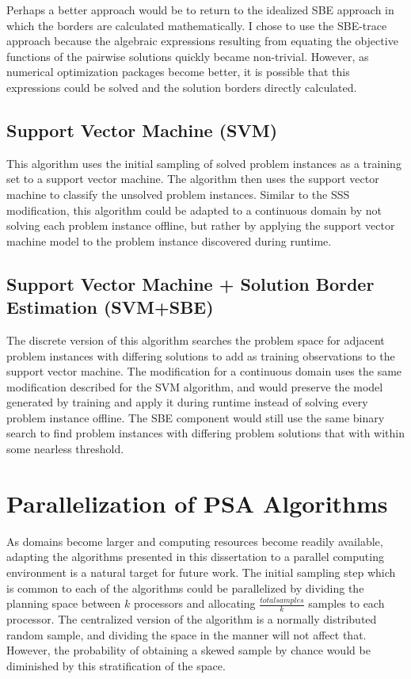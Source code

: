 Perhaps a better approach would be to return to the idealized SBE approach in which the borders are calculated mathematically. I chose to use the SBE-trace approach because the algebraic expressions resulting from equating the objective functions of the pairwise solutions quickly became non-trivial. However, as numerical optimization packages become better, it is possible that this expressions could be solved and the solution borders directly calculated.


\subsection{Support Vector Machine (SVM)}
This algorithm uses the initial sampling of solved problem instances as a training set to a support vector machine.  The algorithm then uses the support vector machine to classify the unsolved problem instances.  Similar to the SSS modification, this algorithm could be adapted to a continuous domain by not solving each problem instance offline, but rather by applying the support vector machine model to the problem instance discovered during runtime.

\subsection{Support Vector Machine + Solution Border Estimation (SVM+SBE)}
The discrete version of this algorithm searches the problem space for adjacent problem instances with differing solutions to add as training observations to the support vector machine.  The modification for a continuous domain uses the same modification described for the SVM algorithm, and would preserve the model generated by training and apply it during runtime instead of solving every problem instance offline.  The SBE component would still use the same binary search to find problem instances with differing problem solutions that with within some nearless threshold.

\section{Parallelization of PSA Algorithms}

As domains become larger and computing resources become  readily available, adapting the algorithms presented in this dissertation to a parallel computing environment is a natural target for future work.  The initial sampling step which is common to each of the algorithms could be parallelized by dividing the planning space between $k$ processors and allocating $\frac{total samples}{k}$ samples to each processor. The centralized version of the algorithm is a normally distributed random sample, and dividing the space in the manner will not affect that.  However, the probability of obtaining a skewed sample by chance would be diminished by this stratification of the space.

